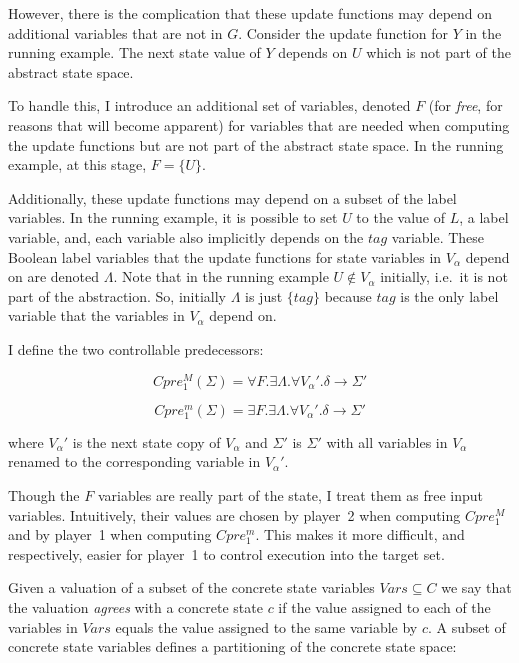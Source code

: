 However, there is the complication that these update functions may depend on additional variables that are not in $G$. Consider the update function for $Y$ in the running example. The next state value of $Y$ depends on $U$ which is not part of the abstract state space.

To handle this, I introduce an additional set of variables, denoted $F$ (for \emph{free}, for reasons that will become apparent) for variables that are needed when computing the update functions but are not part of the abstract state space. In the running example, at this stage, $F=\{U\}$.

Additionally, these update functions may depend on a subset of the label variables. In the running example, it is possible to set $U$ to the value of $L$, a label variable, and, each variable also implicitly depends on the $tag$ variable. These Boolean label variables that the update functions for state variables in $V_\alpha$ depend on are denoted $\Lambda$. Note that in the running example $U \notin V_\alpha$ initially, i.e.\ it is not part of the abstraction. So, initially $\Lambda$ is just $\{tag\}$ because $tag$ is the only label variable that the variables in $V_\alpha$ depend on.

I define the two controllable predecessors:

\begin{equation}
    \label{eqn:symb_cpre_M}
    Cpre_1^M(\Sigma) = \forall F. \exists \Lambda. \forall V_\alpha'. \delta \rightarrow \Sigma'
\end{equation}

\begin{equation}
    \label{eqn:symb_cpre_m}
    Cpre_1^m(\Sigma) = \exists F. \exists \Lambda. \forall V_\alpha'. \delta \rightarrow \Sigma'
\end{equation}

\noindent where $V_\alpha'$ is the next state copy of $V_\alpha$ and $\Sigma'$ is $\Sigma'$ with all variables in $V_\alpha$ renamed to the corresponding variable in $V_\alpha'$.

Though the $F$ variables are really part of the state, I treat them as free input variables. Intuitively, their values are chosen by player~2 when computing $Cpre_1^M$ and by player~1 when computing $Cpre_1^m$. This makes it more difficult, and respectively, easier for player~1 to control execution into the target set.

Given a valuation of a subset of the concrete state variables $Vars \subseteq C$ we say that the valuation \emph{agrees} with a concrete state $c$ if the value assigned to each of the variables in $Vars$ equals the value assigned to the same variable by $c$. A subset of concrete state variables defines a partitioning of the concrete state space: 

